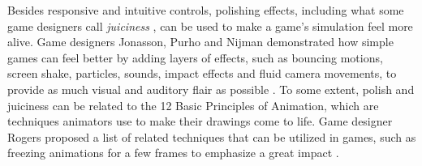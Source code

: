 Besides responsive and intuitive controls, polishing effects, including what some game designers call \textit{juiciness} \cite{schell_art_2008}, can be used to make a game's simulation feel more alive. Game designers Jonasson, Purho and Nijman demonstrated how simple games can feel better by adding layers of effects, such as bouncing motions, screen shake, particles, sounds, impact effects and fluid camera movements, to provide as much visual and auditory flair as possible \cite{juice1, juice2}. To some extent, polish and juiciness can be related to the 12 Basic Principles of Animation, which are techniques animators use to make their drawings come to life. Game designer Rogers proposed a list of related techniques that can be utilized in games, such as freezing animations for a few frames to emphasize a great impact \cite{sticky}.

